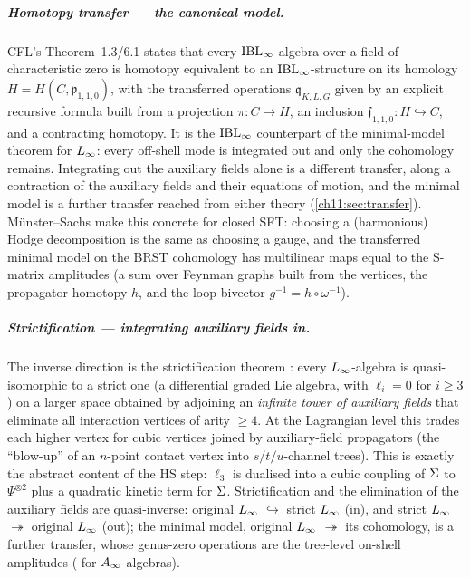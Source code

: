 \subparagraph{Homotopy transfer --- the canonical model.} CFL's
Theorem~1.3/6.1 \cite{Cieliebak:2015:HomologicalAlgebraRelated} states that every $\mathrm{IBL}_\infty$-algebra over a field of characteristic
zero is homotopy equivalent to an $\mathrm{IBL}_\infty$-structure on its homology
$H=H(C,\mathfrak{p}_{1,1,0})$, with the transferred operations $\mathfrak{q}_{K,L,G}$ given by
an explicit recursive formula built from a projection $\pi:C\to H$, an inclusion
$\mathfrak{f}_{1,1,0}:H\hookrightarrow C$, and a contracting homotopy. It
is the $\mathrm{IBL}_\infty$ counterpart of the minimal-model theorem for $L_\infty$: every off-shell mode is integrated out and only the cohomology remains.
Integrating out the auxiliary fields alone is a different transfer, along a contraction of the auxiliary fields and their equations of motion, and the minimal model is a further transfer reached from either theory (\cref{ch11:sec:transfer}). Münster--Sachs
\cite{Muenster:2014:HomotopyClassificationBosonic} make this concrete for closed SFT: choosing a (harmonious) Hodge
decomposition is the same as choosing a gauge, and the transferred minimal model on the BRST
cohomology has multilinear maps equal to the S-matrix amplitudes (a sum over Feynman graphs
built from the vertices, the propagator homotopy $h$, and the loop bivector
$g^{-1}=h\circ\omega^{-1}$).

\subparagraph{Strictification --- integrating auxiliary fields in.} The inverse direction is the
strictification theorem \cite{Borsten:2021:DoubleCopyHomotopy}: every $L_\infty$-algebra is quasi-isomorphic to a
strict one (a differential graded Lie algebra, with $\ell_i=0$ for $i\ge3$) on a larger space
obtained by adjoining an \emph{infinite tower of auxiliary fields} that eliminate all
interaction vertices of arity $\ge4$. At the Lagrangian level this trades each higher vertex for
cubic vertices joined by auxiliary-field propagators (the ``blow-up'' of an $n$-point contact
vertex into $s/t/u$-channel trees). This is exactly the abstract content of the HS step:
$\ell_3$ is dualised into a cubic coupling of $\Sigma$ to $\Psi^{\otimes2}$ plus a quadratic
kinetic term for $\Sigma$. Strictification and the elimination of the auxiliary fields are
quasi-inverse: original $L_\infty$ $\hookrightarrow$ strict $L_\infty$ (in), and strict $L_\infty$
$\twoheadrightarrow$ original $L_\infty$ (out); the minimal model, original $L_\infty$ $\twoheadrightarrow$ its cohomology, is a further transfer, whose genus-zero operations are the tree-level on-shell amplitudes (\cite{Kajiura:2007:NoncommutativeHomotopyAlgebras} for $A_\infty$ algebras).

